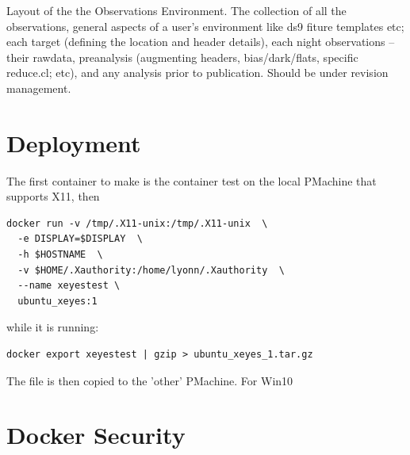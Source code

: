 \documentclass[letter,11pt,oneside]{article}
\newcommand{\dhl}[1]{{\color{verbcolor}{\texttt#1}}}
\begin{document}
Layout of the the Observations Environment. The collection of all the
observations, general aspects of a user's environment like ds9 fiture
templates etc; each target (defining the location and header details),
each night observations -- their rawdata, preanalysis (augmenting
headers, bias/dark/flats, specific reduce.cl; etc), and any analysis
prior to publication. Should be under revision management.

\clearpage


\section{Deployment}

The first container to make is the \dhl{Dockerfile.xeyes} container
test on the local PMachine that supports X11, then

\begin{tcolorbox} %
\begingroup \fontsize{10pt}{10pt}
\selectfont
\begin{verbatim} 
docker run -v /tmp/.X11-unix:/tmp/.X11-unix  \
  -e DISPLAY=$DISPLAY  \
  -h $HOSTNAME  \
  -v $HOME/.Xauthority:/home/lyonn/.Xauthority  \
  --name xeyestest \
  ubuntu_xeyes:1
\end{verbatim}
\endgroup
\end{tcolorbox}

while it is running:

\begin{tcolorbox} %
\begingroup \fontsize{10pt}{10pt}
\selectfont
\begin{verbatim} 
docker export xeyestest | gzip > ubuntu_xeyes_1.tar.gz
\end{verbatim}
\endgroup
\end{tcolorbox}

The \dhl{ubuntu\_xeyes\_1.tar.gz} file is then copied to the 'other'
PMachine. For Win10


\section{Docker Security}
\end{document}
